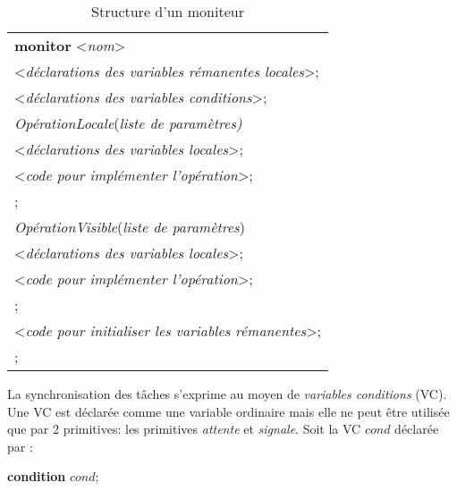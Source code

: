 \begin{center}
\begin{table}[!ht]
\caption{\label{moniteur:struct}Structure d'un moniteur}

\begin{tabular}{l}
{\bf monitor} <{\em nom}> \\
\hspace{0.3cm}<{\em déclarations des variables rémanentes locales}>; \\
\hspace{0.3cm}<{\em déclarations des variables conditions}>;  \\
\hspace{0.3cm}{\bf procedure} {\em OpérationLocale}({\em liste de paramètres)}  \\
\hspace{0.6cm}<{\em déclarations des variables locales}>; \\
\hspace{0.6cm}{\bf begin} <{\em code pour implémenter l'opération}>; \\
\hspace{0.6cm}{\bf end}; \\
\hspace{0.3cm}{\bf entry procedure} {\em OpérationVisible}({\em liste de paramètres}) \\
\hspace{0.6cm}<{\em déclarations des variables locales}>; \\
\hspace{0.6cm}{\bf begin} <{\em code pour implémenter l'opération}>; \\
\hspace{0.6cm}{\bf end}; \\
\hspace{0.3cm}{\bf begin} <{\em code pour initialiser les variables rémanentes}>; \\
\hspace{0.3cm}{\bf end};
\end{tabular}
\end{table}
\end{center}

La synchronisation des tâches s'exprime au moyen de {\em variables conditions} (VC). Une VC est déclarée comme une variable ordinaire mais elle ne peut être utilisée que par 2 primitives: les primitives {\em attente} et {\em signale}. Soit la VC $cond$ déclarée par :

\begin{center}
{\bf condition} $cond$;
\end{center}

